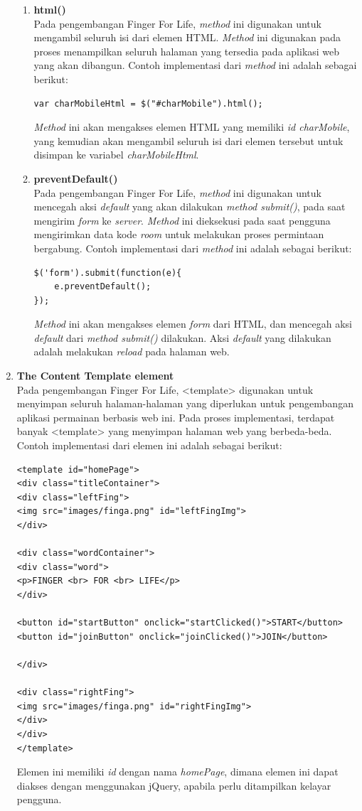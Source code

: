 \begin{enumerate}
\begin{enumerate}
		\item \textbf{html()} \\
		Pada pengembangan Finger For Life, \textit{method} ini digunakan untuk mengambil seluruh isi dari elemen HTML. \textit{Method} ini digunakan pada proses menampilkan seluruh halaman yang tersedia pada aplikasi web yang akan dibangun. Contoh implementasi dari \textit{method} ini adalah sebagai berikut:		
\begin{lstlisting}
var charMobileHtml = $("#charMobile").html();
\end{lstlisting}
		\textit{Method} ini akan mengakses elemen HTML yang memiliki \textit{id charMobile}, yang kemudian akan mengambil seluruh isi dari elemen tersebut untuk disimpan ke variabel \textit{charMobileHtml}.
		
		\item \textbf{preventDefault()} \\
		Pada pengembangan Finger For Life, \textit{method} ini digunakan untuk mencegah aksi \textit{default} yang akan dilakukan \textit{method submit()}, pada saat mengirim \textit{form} ke \textit{server}. \textit{Method} ini dieksekusi pada saat pengguna mengirimkan data kode \textit{room} untuk melakukan proses permintaan bergabung. Contoh implementasi dari \textit{method} ini adalah sebagai berikut:
\begin{lstlisting}
$('form').submit(function(e){
	e.preventDefault();
});
\end{lstlisting}
		\textit{Method} ini akan mengakses elemen \textit{form} dari HTML, dan mencegah aksi \textit{default} dari \textit{method submit()} dilakukan. Aksi \textit{default} yang dilakukan adalah melakukan \textit{reload} pada halaman web.
	\end{enumerate}
	
	\item \textbf{The Content Template element} \\
	Pada pengembangan Finger For Life, <template> digunakan untuk menyimpan seluruh halaman-halaman yang diperlukan untuk pengembangan aplikasi permainan berbasis web ini. Pada proses implementasi, terdapat banyak <template> yang menyimpan halaman web yang berbeda-beda. Contoh implementasi dari elemen ini adalah sebagai berikut:
\begin{lstlisting}
<template id="homePage">
<div class="titleContainer">
<div class="leftFing">
<img src="images/finga.png" id="leftFingImg">
</div>
	
<div class="wordContainer">
<div class="word">
<p>FINGER <br> FOR <br> LIFE</p>
</div>
	
<button id="startButton" onclick="startClicked()">START</button>
<button id="joinButton" onclick="joinClicked()">JOIN</button>
	
</div>
	
<div class="rightFing">
<img src="images/finga.png" id="rightFingImg">
</div>
</div>
</template>
\end{lstlisting}
Elemen ini memiliki \textit{id} dengan nama \textit{homePage}, dimana elemen ini dapat diakses dengan menggunakan jQuery, apabila perlu ditampilkan kelayar pengguna.

\end{enumerate}

